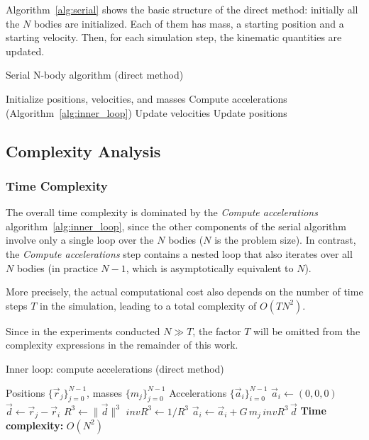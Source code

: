 \documentclass{article}
\begin{document}
Algorithm~\ref{alg:serial} shows the basic structure of the direct method: initially all the $N$ bodies are initialized. Each of them has mass, a starting position and a starting velocity. Then, for each simulation step, the kinematic quantities are updated. 

\begin{algorithm}[H]
\caption{Serial N-body algorithm (direct method)}
\label{alg:serial}
\begin{algorithmic}[1]
\State Initialize positions, velocities, and masses
    \State Compute accelerations (Algorithm~\ref{alg:inner_loop})
    \State Update velocities
    \State Update positions
\EndFor
\end{algorithmic}
\end{algorithm}

\subsection{Complexity Analysis}

\subsubsection{Time Complexity}
\label{subsec:time_complexity}
The overall time complexity is dominated by the \emph{Compute accelerations} algorithm~\ref{alg:inner_loop}, since the other components of the serial algorithm involve only a single loop over the $N$ bodies ($N$ is the problem size). In contrast, the \emph{Compute accelerations} step contains a nested loop that also iterates over all $N$ bodies (in practice $N-1$, which is asymptotically equivalent to $N$). 

More precisely, the actual computational cost also depends on the number of time steps $T$ in the simulation, leading to a total complexity of $O(T N^2)$.

Since in the experiments conducted $N \gg T$, the factor $T$ will be omitted from the complexity expressions in the remainder of this work.

\begin{algorithm}
\caption{Inner loop: compute accelerations (direct method)}
\label{alg:inner_loop}
\begin{algorithmic}[1]
\Require Positions $\{\vec r_j\}_{j=0}^{N-1}$, masses $\{m_j\}_{j=0}^{N-1}$
\Ensure Accelerations $\{\vec a_i\}_{i=0}^{N-1}$
  \State $\vec a_i \gets (0,0,0)$
      \State $\vec d \gets \vec r_j - \vec r_i$
      \State $R^3 \gets \|\vec d\|^3 $
      \State $invR^3 \gets 1 /R^3$
      \State $\vec a_i \gets \vec a_i + G \, m_j \, invR^3 \, \vec d$
    \EndIf
  \EndFor
\EndFor
\Statex \textbf{Time complexity:} $O(N^2)$
\end{algorithmic}
\end{algorithm}
\end{document}
